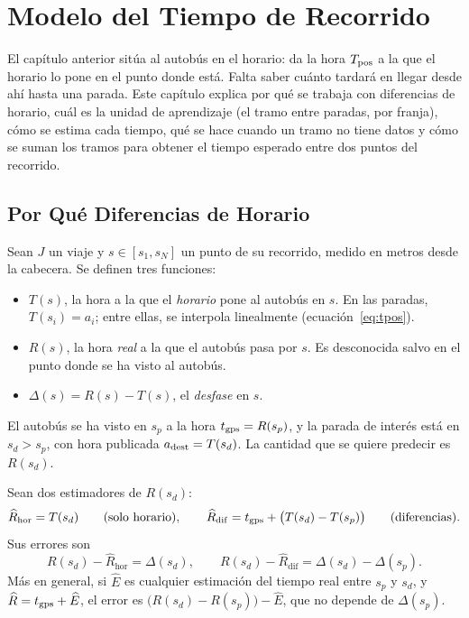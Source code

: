 \chapter{Modelo del Tiempo de Recorrido}
\label{cap:modelo}

El capítulo anterior sitúa al autobús en el horario: da la hora $T_{\mathrm{pos}}$ a la que el horario lo pone en el punto donde
está. Falta saber cuánto tardará en llegar desde ahí hasta una parada. Este capítulo explica por qué se trabaja con
diferencias de horario, cuál es la unidad de aprendizaje (el tramo entre paradas, por franja), cómo se estima cada
tiempo, qué se hace cuando un tramo no tiene datos y cómo se suman los tramos para obtener el tiempo esperado entre dos
puntos del recorrido.

\section{Por Qué Diferencias de Horario}
\label{sec:diferencias}

Sean $J$ un viaje y $s\in[s_1,s_N]$ un punto de su recorrido, medido en metros desde la cabecera. Se definen tres
funciones:

\begin{itemize}
  \item $T(s)$, la hora a la que el \emph{horario} pone al autobús en $s$. En las paradas, $T(s_i)=a_i$; entre ellas,
        se interpola linealmente (ecuación~\eqref{eq:tpos}).
  \item $R(s)$, la hora \emph{real} a la que el autobús pasa por $s$. Es desconocida salvo en el punto donde se ha
        visto al autobús.
  \item $\Delta(s)=R(s)-T(s)$, el \emph{desfase} en $s$.
\end{itemize}

El autobús se ha visto en $s_p$ a la hora $t_{\mathrm{gps}}=R(s_p)$, y la parada de interés está en $s_d>s_p$, con hora
publicada $a_{\mathrm{dest}}=T(s_d)$. La cantidad que se quiere predecir es $R(s_d)$.

\begin{proposicion}
\label{prop:diferencias}
Sean dos estimadores de $R(s_d)$:
\[
\widehat R_{\mathrm{hor}}=T(s_d)\qquad\text{(solo horario)},\qquad
\widehat R_{\mathrm{dif}}=t_{\mathrm{gps}}+\big(T(s_d)-T(s_p)\big)\qquad\text{(diferencias)}.
\]
Sus errores son
\[
R(s_d)-\widehat R_{\mathrm{hor}}=\Delta(s_d),\qquad
R(s_d)-\widehat R_{\mathrm{dif}}=\Delta(s_d)-\Delta(s_p).
\]
Más en general, si $\widehat E$ es cualquier estimación del tiempo real entre $s_p$ y $s_d$, y
$\widehat R=t_{\mathrm{gps}}+\widehat E$, el error es $\big(R(s_d)-R(s_p)\big)-\widehat E$, que no depende de $\Delta(s_p)$.
\end{proposicion}

